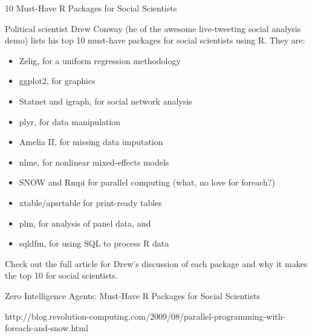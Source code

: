 10 Must-Have R Packages for Social Scientists


Political scientist Drew Conway (he of the awesome live-tweeting social analysis demo) 
lists his top 10 must-have packages for social scientists using R. They are:

\begin{itemize}
\item Zelig, for a uniform regression methodology
\item ggplot2, for graphics
\item Statnet and igraph, for social network analysis
\item plyr, for data manipulation
\item Amelia II, for missing data imputation
\item nlme, for nonlinear mixed-effects models
\item SNOW and Rmpi for parallel computing (what, no love for foreach?)
\item xtable/apsrtable for print-ready tables
\item plm, for analysis of panel data, and
\item sqldfm, for using SQL to process R data
\end{itemize}

 

Check out the full article for Drew's discussion of each package and why it makes the top 10 for social scientists. 

Zero Intelligence Agents: Must-Have R Packages for Social Scientists


http://blog.revolution-computing.com/2009/08/parallel-programming-with-foreach-and-snow.html

